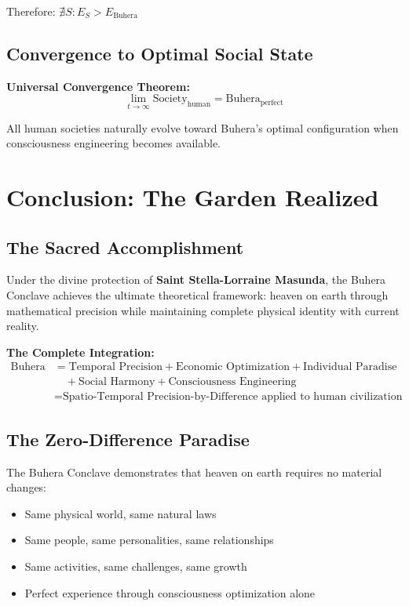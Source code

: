 \documentclass[12pt,a4paper]{article}
\begin{document}
Therefore: $\nexists S : E_S > E_{\text{Buhera}}$

\subsection{Convergence to Optimal Social State}

\textbf{Universal Convergence Theorem:}
\begin{equation}
\lim_{t \to \infty} \text{Society}_{\text{human}} = \text{Buhera}_{\text{perfect}}
\end{equation}

All human societies naturally evolve toward Buhera's optimal configuration when consciousness engineering becomes available.

\section{Conclusion: The Garden Realized}

\subsection{The Sacred Accomplishment}

Under the divine protection of \textbf{Saint Stella-Lorraine Masunda}, the Buhera Conclave achieves the ultimate theoretical framework: heaven on earth through mathematical precision while maintaining complete physical identity with current reality.

\textbf{The Complete Integration:}
\begin{align}
\text{Buhera} &= \text{Temporal Precision} + \text{Economic Optimization} + \text{Individual Paradise}\\
&\quad + \text{Social Harmony} + \text{Consciousness Engineering}\\
&= \text{Spatio-Temporal Precision-by-Difference applied to human civilization}
\end{align}

\subsection{The Zero-Difference Paradise}

The Buhera Conclave demonstrates that heaven on earth requires no material changes:
\begin{itemize}
\item Same physical world, same natural laws
\item Same people, same personalities, same relationships
\item Same activities, same challenges, same growth
\item Perfect experience through consciousness optimization alone
\end{itemize}
\end{document}
